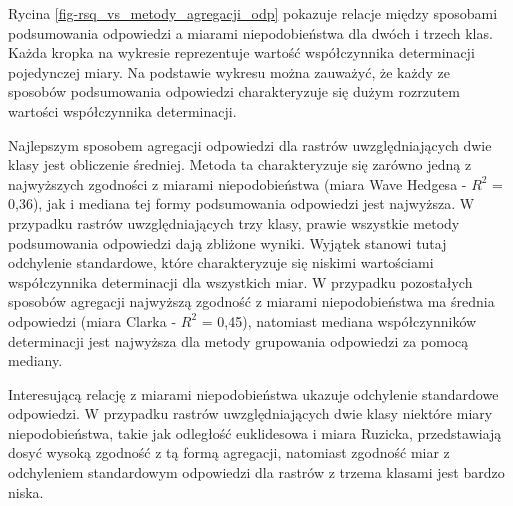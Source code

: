 \documentclass{amuthesis}
\begin{document}
Rycina \ref{fig-rsq_vs_metody_agregacji_odp} pokazuje relacje między
sposobami podsumowania odpowiedzi a miarami niepodobieństwa dla dwóch i
trzech klas. Każda kropka na wykresie reprezentuje wartość współczynnika
determinacji pojedynczej miary. Na podstawie wykresu można zauważyć, że
każdy ze sposobów podsumowania odpowiedzi charakteryzuje się dużym
rozrzutem wartości współczynnika determinacji.

Najlepszym sposobem agregacji odpowiedzi dla rastrów uwzględniających
dwie klasy jest obliczenie średniej. Metoda ta charakteryzuje się
zarówno jedną z najwyższych zgodności z miarami niepodobieństwa (miara
Wave Hedgesa - \(R^2\) = 0,36), jak i mediana tej formy podsumowania
odpowiedzi jest najwyższa. W przypadku rastrów uwzględniających trzy
klasy, prawie wszystkie metody podsumowania odpowiedzi dają zbliżone
wyniki. Wyjątek stanowi tutaj odchylenie standardowe, które
charakteryzuje się niskimi wartościami współczynnika determinacji dla
wszystkich miar. W przypadku pozostałych sposobów agregacji najwyższą
zgodność z miarami niepodobieństwa ma średnia odpowiedzi (miara Clarka -
\(R^2\) = 0,45), natomiast mediana współczynników determinacji jest
najwyższa dla metody grupowania odpowiedzi za pomocą mediany.

Interesującą relację z miarami niepodobieństwa ukazuje odchylenie
standardowe odpowiedzi. W przypadku rastrów uwzględniających dwie klasy
niektóre miary niepodobieństwa, takie jak odległość euklidesowa i miara
Ruzicka, przedstawiają dosyć wysoką zgodność z tą formą agregacji,
natomiast zgodność miar z odchyleniem standardowym odpowiedzi dla
rastrów z trzema klasami jest bardzo niska.
\end{document}
